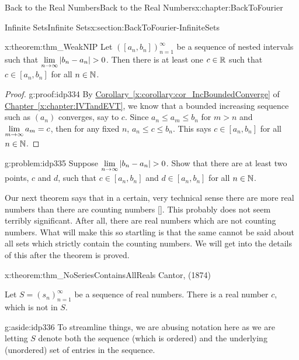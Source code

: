 \begin{chapterptx}{Back to the Real Numbers}{}{Back to the Real Numbers}{}{}{x:chapter:BackToFourier}
\begin{sectionptx}{Infinite Sets}{}{Infinite Sets}{}{}{x:section:BackToFourier-InfiniteSets}
		\begin{theorem}{}{}{x:theorem:thm_WeakNIP}%
			 Let \(\left(\left[a_n, b_n\right]\right)_{n=1}^\infty\) be a sequence of nested intervals such that \({\displaystyle\lim_{n\rightarrow \infty}\left|b_n-a_n\right|}>0\). Then there is at least one \(c\in\mathbb {R}\) such that \(c\in\left[a_n, b_n\right]\) for all \(n\in\mathbb {N}\).%
		\end{theorem}
		\begin{proof}{}{g:proof:idp334}
			By \hyperref[x:corollary:cor_IncBoundedConverge]{Corollary~{\xreffont\ref{x:corollary:cor_IncBoundedConverge}}} of \hyperref[x:chapter:IVTandEVT]{Chapter~{\xreffont\ref{x:chapter:IVTandEVT}}}, we know that a bounded increasing sequence such as \((a_n)\) converges, say to \(c\). Since \(a_n\leq a_m\leq b_n\) for \(m>n\) and \({\displaystyle\lim_{m\rightarrow \infty}a_m}=c\), then for any fixed \(n\), \(a_n\leq c\leq b_n\). This says \(c\in\left[a_n, b_n\right]\) for all \(n\in\mathbb {N}\).%
		\end{proof}
		\begin{problem}{}{g:problem:idp335}%
			 Suppose \({\displaystyle\lim_{n\rightarrow \infty}\left|b_n-a_n\right|}>0\).  Show that there are at least two points, \(c\) and \(d\), such that \(c\in[a_n, b_n]\) and \(d\in[a_n, b_n]\) for all \(n\in\mathbb {N}\).%
		\end{problem}
		Our next theorem says that in a certain, very technical sense there are more real numbers than there are counting numbers \hyperlink{x:biblio:franks10__cantor_other_proof_rr_uncoun}{[{}]}. This probably does not seem terribly significant.  After all, there are real numbers which are not counting numbers.  What will make this so startling is that the same cannot be said about all sets which strictly contain the counting numbers.  We will get into the details of this after the theorem is proved.%
		\begin{theorem}{}{}{x:theorem:thm_NoSeriesContainsAllReals}%
			\alert{Cantor, (1874)}%
			\par
			 Let \(S=\left(s_n\right)_{n=1}^\infty\) be a sequence of real numbers.  There is a real number \(c\), which is not in  \(S\).%
			\begin{aside}{}{g:aside:idp336}%
				To streamline things, we are abusing notation here as we are letting \(S\) denote both the sequence (which is ordered) and the underlying (unordered) set of entries in the sequence.%
			\end{aside}

\end{theorem}
\end{sectionptx}
\end{chapterptx}
